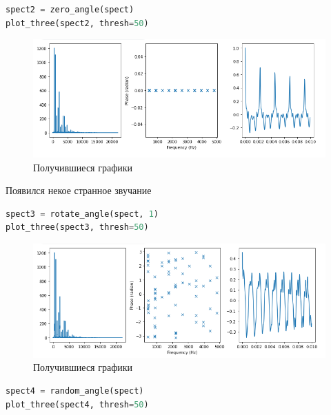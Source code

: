 \begin{lstlisting}[language=Python]
spect2 = zero_angle(spect)
plot_three(spect2, thresh=50)
\end{lstlisting}

\begin{figure}[H]
	\begin{center}
		\includegraphics[scale=0.66]{fig/lab06/lab06_16.png}
		\caption{Получившиеся графики}
	\end{center}
\end{figure}

Появился некое странное звучание

\begin{lstlisting}[language=Python]
spect3 = rotate_angle(spect, 1)
plot_three(spect3, thresh=50)
\end{lstlisting}

\begin{figure}[H]
	\begin{center}
		\includegraphics[scale=0.66]{fig/lab06/lab06_17.png}
		\caption{Получившиеся графики}
	\end{center}
\end{figure}

\begin{lstlisting}[language=Python]
spect4 = random_angle(spect)
plot_three(spect4, thresh=50)
\end{lstlisting}

